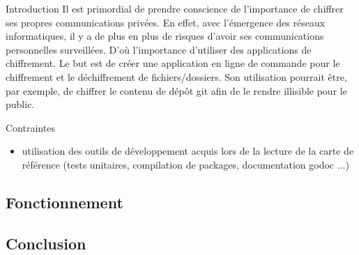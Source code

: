 \documentclass{beamer}
\begin{document}
\begin{frame}
\begin{block}{Introduction} 
	Il est primordial de prendre conscience de l'importance de chiffrer ses propres communications privées. En effet, avec l'émergence des réseaux informatiques, il y a de plus en plus de risques d'avoir ses communications personnelles surveillées. D'où l'importance d'utiliser des applications de chiffrement.
	Le but est de créer une application en ligne de commande pour le chiffrement et le déchiffrement de fichiers/dossiers. Son utilisation pourrait être, par exemple, de chiffrer le contenu de dépôt git afin de le rendre illisible pour le public. 
\end{block}

\begin{alertblock}{Contraintes} 
	\begin{itemize}
		[circle]
		\item utilisation des outils de développement acquis lors de la lecture de la carte de référence (tests unitaires, compilation de packages, documentation godoc ...)
	\end{itemize}
\end{alertblock}
\end{frame}

\subsection{Fonctionnement}

\subsection{Conclusion}


      
\end{document}
